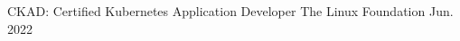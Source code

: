 

\begin{cventries}

    \cventry
    {CKAD: Certified Kubernetes Application Developer} %
    {} %
    {The Linux Foundation} %
    {Jun. 2022} %
    {
    }

\end{cventries}
